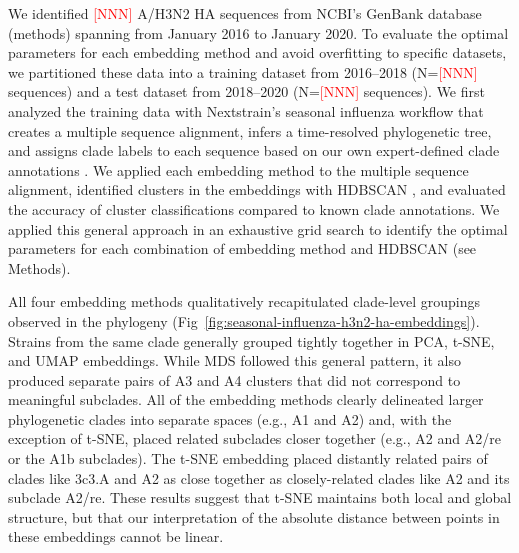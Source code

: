 \documentclass[10pt,letterpaper]{article}
\def\jhc#1{\textcolor{red}{[#1]}}
\begin{document}
We identified \jhc{NNN} A/H3N2 HA sequences from NCBI's GenBank database (methods) spanning from January 2016 to January 2020.
To evaluate the optimal parameters for each embedding method and avoid overfitting to specific datasets, we partitioned these data into a training dataset from 2016--2018 (N=\jhc{NNN} sequences) and a test dataset from 2018--2020 (N=\jhc{NNN} sequences).
We first analyzed the training data with Nextstrain's seasonal influenza workflow that creates a multiple sequence alignment, infers a time-resolved phylogenetic tree, and assigns clade labels to each sequence based on our own expert-defined clade annotations \cite{nextstrain,seasonal-flu,augur}.
We applied each embedding method to the multiple sequence alignment, identified clusters in the embeddings with HDBSCAN \cite{hdbscan}, and evaluated the accuracy of cluster classifications compared to known clade annotations.
We applied this general approach in an exhaustive grid search to identify the optimal parameters for each combination of embedding method and HDBSCAN (see Methods).

All four embedding methods qualitatively recapitulated clade-level groupings observed in the phylogeny (Fig~\ref{fig:seasonal-influenza-h3n2-ha-embeddings}).
Strains from the same clade generally grouped tightly together in PCA, t-SNE, and UMAP embeddings.
While MDS followed this general pattern, it also produced separate pairs of A3 and A4 clusters that did not correspond to meaningful subclades.
All of the embedding methods clearly delineated larger phylogenetic clades into separate spaces (e.g., A1 and A2) and, with the exception of t-SNE, placed related subclades closer together (e.g., A2 and A2/re or the A1b subclades).
The t-SNE embedding placed distantly related pairs of clades like 3c3.A and A2 as close together as closely-related clades like A2 and its subclade A2/re.
These results suggest that t-SNE maintains both local and global structure, but that our interpretation of the absolute distance between points in these embeddings cannot be linear.

\end{document}

